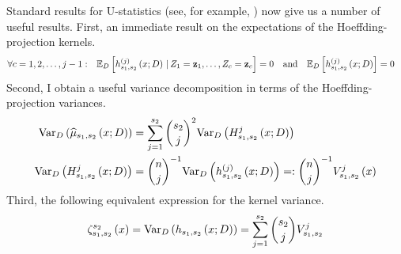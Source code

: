 Standard results for U-statistics (see, for example, \citet{lee_u-statistics_2019}) now give us a number of useful results.
First, an immediate result on the expectations of the Hoeffding-projection kernels.
\begin{align}\label{eq:H_k_expectation}
	\forall c = 1,2,\dotsc, j-1: \quad & \mathbb{E}_{D}\left[h_{s_1, s_2}^{(j)}\left(x; D\right) \, | \, Z_1 = \mathbf{z}_1, \dotsc, Z_c = \mathbf{z}_c\right] = 0
	\quad \text{and} \quad
	\mathbb{E}_{D}\left[h_{s_1, s_2}^{(j)}\left(x; D\right)\right] = 0
\end{align}
Second, I obtain a useful variance decomposition in terms of the Hoeffding-projection variances.
\begin{align}\label{eq:Var_decomp}
	\text{Var}_{D}\left(\widehat{\mu}_{s_1, s_2}\left(x; D\right)\right)
	 & = \sum_{j = 1}^{s_2} \binom{s_2}{j}^2 \text{Var}_{D}\left(H_{s_1, s_2}^{j}\left(x; D\right)\right) \\
	\text{Var}_{D}\left(H_{s_1, s_2}^{j}\left(x; D\right)\right)
	 & = \binom{n}{j}^{-1} \text{Var}_{D}\left(h_{s_1, s_2}^{(j)}\left(x; D\right)\right)
	=: \binom{n}{j}^{-1} V_{s_1, s_2}^{j}\left(x\right)
\end{align}
Third, the following equivalent expression for the kernel variance.
\begin{equation}\label{eq:k_var}
	\zeta_{s_1, s_2}^{s_2}\left(x\right)
	= \text{Var}_{D}\left(h_{s_1, s_2}\left(x; D\right)\right)
	= \sum_{j = 1}^{s_2} \binom{s_2}{j}V_{s_1, s_2}^{j}
\end{equation}

